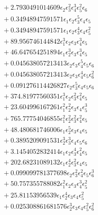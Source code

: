 \documentclass[10pt]{article}
\begin{document}
\begin{align*}
&{}  + 2.7930491014609 \epsilon_{2} \epsilon_{3}^{2} \epsilon_{4}^{3} \epsilon_{5}^{2} \epsilon_{6} \\
&{}  + 0.34948947591571 \epsilon_{1} \epsilon_{2} \epsilon_{3}^{5} \epsilon_{4} \epsilon_{5} \\
&{}  + 0.34948947591571 \epsilon_{1} \epsilon_{2} \epsilon_{3}^{4} \epsilon_{4} \epsilon_{5}^{2} \\
&{}  + 89.956746144842 \epsilon_{1}^{3} \epsilon_{2} \epsilon_{3} \epsilon_{4}^{3} \epsilon_{5} \\
&{}  + 46.647654251894 \epsilon_{1} \epsilon_{2}^{3} \epsilon_{3} \epsilon_{4}^{3} \epsilon_{5} \\
&{}  + 0.045638057213413 \epsilon_{2} \epsilon_{3} \epsilon_{4}^{5} \epsilon_{5} \epsilon_{6} \\
&{}  + 0.045638057213413 \epsilon_{2} \epsilon_{3} \epsilon_{4}^{4} \epsilon_{5} \epsilon_{6}^{2} \\
&{}  + 0.091276114426827 \epsilon_{2} \epsilon_{3}^{5} \epsilon_{4} \epsilon_{5} \epsilon_{6} \\
&{}  + 374.81977560351 \epsilon_{1}^{3} \epsilon_{2} \epsilon_{3}^{2} \epsilon_{4}^{2} \epsilon_{5} \\
&{}  + 23.604996167261 \epsilon_{1}^{2} \epsilon_{2}^{2} \epsilon_{3} \epsilon_{4} \epsilon_{5}^{3} \\
&{}  + 765.77754046855 \epsilon_{1}^{2} \epsilon_{2}^{2} \epsilon_{3}^{2} \epsilon_{4}^{2} \epsilon_{5} \\
&{}  + 48.480681746006 \epsilon_{1} \epsilon_{2}^{5} \epsilon_{3} \epsilon_{4} \epsilon_{5} \\
&{}  + 0.3895209091531 \epsilon_{2}^{3} \epsilon_{3}^{3} \epsilon_{4} \epsilon_{5} \epsilon_{6} \\
&{}  + 3.1454052832414 \epsilon_{1} \epsilon_{2} \epsilon_{3}^{4} \epsilon_{4}^{2} \epsilon_{5} \\
&{}  + 202.68231089132 \epsilon_{1} \epsilon_{2}^{4} \epsilon_{3}^{2} \epsilon_{4} \epsilon_{5} \\
&{}  + 0.099099781377698 \epsilon_{2} \epsilon_{3}^{2} \epsilon_{4}^{2} \epsilon_{5} \epsilon_{6}^{3} \\
&{}  + 50.757355788082 \epsilon_{1}^{2} \epsilon_{2} \epsilon_{3} \epsilon_{4}^{3} \epsilon_{5}^{2} \\
&{}  + 25.81153956539 \epsilon_{1} \epsilon_{2}^{4} \epsilon_{3} \epsilon_{4} \epsilon_{5}^{2} \\
&{}  + 0.025308861681576 \epsilon_{2}^{3} \epsilon_{3} \epsilon_{4} \epsilon_{5}^{2} \epsilon_{6}^{2} \\

\end{align*}
\end{document}
